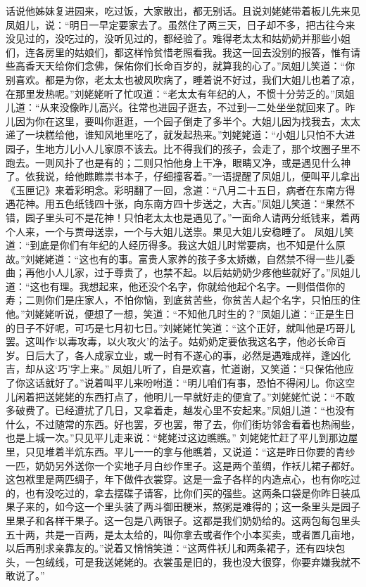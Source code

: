 \documentclass[12pt,oneside]{book}
\begin{document}
话说他姊妹复进园来，吃过饭，大家散出，都无别话。且说刘姥姥带着板儿先来见凤姐儿，说：“明日一早定要家去了。虽然住了两三天，日子却不多，把古往今来没见过的，没吃过的，没听见过的，都经验了。难得老太太和姑奶奶并那些小姐们，连各房里的姑娘们，都这样怜贫惜老照看我。我这一回去没别的报答，惟有请些高香天天给你们念佛，保佑你们长命百岁的，就算我的心了。”凤姐儿笑道：“你别喜欢。都是为你，老太太也被风吹病了，睡着说不好过，我们大姐儿也着了凉，在那里发热呢。”刘姥姥听了忙叹道：“老太太有年纪的人，不惯十分劳乏的。”凤姐儿道：“从来没像昨儿高兴。往常也进园子逛去，不过到一二处坐坐就回来了。昨儿因为你在这里，要叫你逛逛，一个园子倒走了多半个。大姐儿因为找我去，太太递了一块糕给他，谁知风地里吃了，就发起热来。”刘姥姥道：“小姐儿只怕不大进园子，生地方儿小人儿家原不该去。比不得我们的孩子，会走了，那个坟圈子里不跑去。一则风扑了也是有的；二则只怕他身上干净，眼睛又净，或是遇见什么神了。依我说，给他瞧瞧祟书本子，仔细撞客着。”一语提醒了凤姐儿，便叫平儿拿出《玉匣记》来着彩明念。彩明翻了一回，念道：“八月二十五日，病者在东南方得遇花神。用五色纸钱四十张，向东南方四十步送之，大吉。”凤姐儿笑道：“果然不错，园子里头可不是花神！只怕老太太也是遇见了。”一面命人请两分纸钱来，着两个人来，一个与贾母送祟，一个与大姐儿送祟。果见大姐儿安稳睡了。
凤姐儿笑道：“到底是你们有年纪的人经历得多。我这大姐儿时常要病，也不知是什么原故。”刘姥姥道：“这也有的事。富贵人家养的孩子多太娇嫩，自然禁不得一些儿委曲；再他小人儿家，过于尊贵了，也禁不起。以后姑奶奶少疼他些就好了。”凤姐儿道：“这也有理。我想起来，他还没个名字，你就给他起个名字。一则借借你的寿；二则你们是庄家人，不怕你恼，到底贫苦些，你贫苦人起个名字，只怕压的住他。”刘姥姥听说，便想了一想，笑道：“不知他几时生的？”凤姐儿道：“正是生日的日子不好呢，可巧是七月初七日。”刘姥姥忙笑道：“这个正好，就叫他是巧哥儿罢。这叫作‘以毒攻毒，以火攻火’的法子。姑奶奶定要依我这名字，他必长命百岁。日后大了，各人成家立业，或一时有不遂心的事，必然是遇难成祥，逢凶化吉，却从这‘巧’字上来。”
凤姐儿听了，自是欢喜，忙道谢，又笑道：“只保佑他应了你这话就好了。”说着叫平儿来吩咐道：“明儿咱们有事，恐怕不得闲儿。你这空儿闲着把送姥姥的东西打点了，他明儿一早就好走的便宜了。”刘姥姥忙说：“不敢多破费了。已经遭扰了几日，又拿着走，越发心里不安起来。”凤姐儿道：“也没有什么，不过随常的东西。好也罢，歹也罢，带了去，你们街坊邻舍看着也热闹些，也是上城一次。”只见平儿走来说：“姥姥过这边瞧瞧。”
刘姥姥忙赶了平儿到那边屋里，只见堆着半炕东西。平儿一一的拿与他瞧着，又说道：“这是昨日你要的青纱一匹，奶奶另外送你一个实地子月白纱作里子。这是两个茧绸，作袄儿裙子都好。这包袱里是两匹绸子，年下做件衣裳穿。这是一盒子各样的内造点心，也有你吃过的，也有没吃过的，拿去摆碟子请客，比你们买的强些。这两条口袋是你昨日装瓜果子来的，如今这一个里头装了两斗御田粳米，熬粥是难得的；这一条里头是园子里果子和各样干果子。这一包是八两银子。这都是我们奶奶给的。这两包每包里头五十两，共是一百两，是太太给的，叫你拿去或者作个小本买卖，或者置几亩地，以后再别求亲靠友的。”说着又悄悄笑道：“这两件袄儿和两条裙子，还有四块包头，一包绒线，可是我送姥姥的。衣裳虽是旧的，我也没大很穿，你要弃嫌我就不敢说了。”
\end{document}
